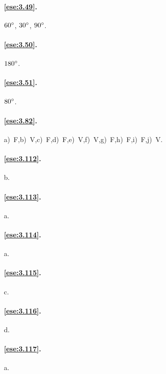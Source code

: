 \paragraph{\ref{ese:3.49}.}
$60{}^{\circ}$, $30{}^{\circ}$, $90{}^{\circ}$.

\paragraph{\ref{ese:3.50}.}
$180{}^{\circ}$.

\paragraph{\ref{ese:3.51}.}
$80{}^{\circ}$.

\paragraph{\ref{ese:3.82}.}
a)~F,\quad b)~V,\quad c)~F,\quad d)~F,\quad e)~V,\quad f)~V,\quad g)~F,\quad h)~F,\quad i)~F,\quad j)~V.

\paragraph{\ref{ese:3.112}.}
b.

\paragraph{\ref{ese:3.113}.}
a.

\paragraph{\ref{ese:3.114}.}
a.

\paragraph{\ref{ese:3.115}.}
c.

\paragraph{\ref{ese:3.116}.}
d.

\paragraph{\ref{ese:3.117}.}
a.

\endgroup
